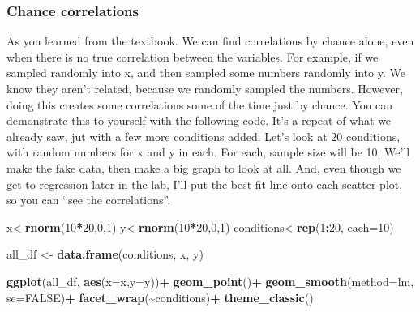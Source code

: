 \documentclass[
]{book}
\newenvironment{Shaded}{\begin{snugshade}}{\end{snugshade}}
\newcommand{\AttributeTok}[1]{\textcolor[rgb]{0.13,0.29,0.53}{#1}}
\newcommand{\ConstantTok}[1]{\textcolor[rgb]{0.56,0.35,0.01}{#1}}
\newcommand{\DecValTok}[1]{\textcolor[rgb]{0.00,0.00,0.81}{#1}}
\newcommand{\FunctionTok}[1]{\textcolor[rgb]{0.13,0.29,0.53}{\textbf{#1}}}
\newcommand{\NormalTok}[1]{#1}
\newcommand{\OtherTok}[1]{\textcolor[rgb]{0.56,0.35,0.01}{#1}}
\newcommand{\SpecialCharTok}[1]{\textcolor[rgb]{0.81,0.36,0.00}{\textbf{#1}}}
\begin{document}
\hypertarget{chance-correlations}{%
\subsubsection{Chance correlations}\label{chance-correlations}}

As you learned from the textbook. We can find correlations by chance alone, even when there is no true correlation between the variables. For example, if we sampled randomly into x, and then sampled some numbers randomly into y. We know they aren't related, because we randomly sampled the numbers. However, doing this creates some correlations some of the time just by chance. You can demonstrate this to yourself with the following code. It's a repeat of what we already saw, jut with a few more conditions added. Let's look at 20 conditions, with random numbers for x and y in each. For each, sample size will be 10. We'll make the fake data, then make a big graph to look at all. And, even though we get to regression later in the lab, I'll put the best fit line onto each scatter plot, so you can ``see the correlations''.

\begin{Shaded}
\begin{Highlighting}[]
\NormalTok{x}\OtherTok{\textless{}{-}}\FunctionTok{rnorm}\NormalTok{(}\DecValTok{10}\SpecialCharTok{*}\DecValTok{20}\NormalTok{,}\DecValTok{0}\NormalTok{,}\DecValTok{1}\NormalTok{)}
\NormalTok{y}\OtherTok{\textless{}{-}}\FunctionTok{rnorm}\NormalTok{(}\DecValTok{10}\SpecialCharTok{*}\DecValTok{20}\NormalTok{,}\DecValTok{0}\NormalTok{,}\DecValTok{1}\NormalTok{)}
\NormalTok{conditions}\OtherTok{\textless{}{-}}\FunctionTok{rep}\NormalTok{(}\DecValTok{1}\SpecialCharTok{:}\DecValTok{20}\NormalTok{, }\AttributeTok{each=}\DecValTok{10}\NormalTok{)}

\NormalTok{all\_df }\OtherTok{\textless{}{-}} \FunctionTok{data.frame}\NormalTok{(conditions, x, y)}

\FunctionTok{ggplot}\NormalTok{(all\_df, }\FunctionTok{aes}\NormalTok{(}\AttributeTok{x=}\NormalTok{x,}\AttributeTok{y=}\NormalTok{y))}\SpecialCharTok{+}
  \FunctionTok{geom\_point}\NormalTok{()}\SpecialCharTok{+}
  \FunctionTok{geom\_smooth}\NormalTok{(}\AttributeTok{method=}\NormalTok{lm, }\AttributeTok{se=}\ConstantTok{FALSE}\NormalTok{)}\SpecialCharTok{+}
  \FunctionTok{facet\_wrap}\NormalTok{(}\SpecialCharTok{\textasciitilde{}}\NormalTok{conditions)}\SpecialCharTok{+}
  \FunctionTok{theme\_classic}\NormalTok{()}
\end{Highlighting}
\end{Shaded}
\end{document}
